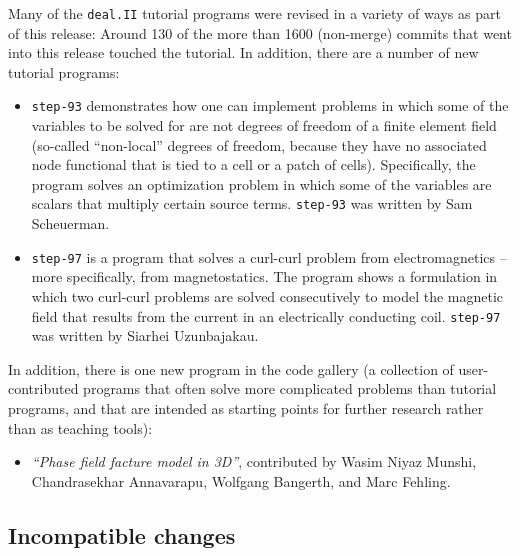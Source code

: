 \documentclass{ansarticle-preprint}
\newcommand{\specialword}[1]{\texttt{#1}}
\newcommand{\dealii}{{\specialword{deal.II}}\xspace}
\newcommand{\step}[1]{{\specialword{step-#1}}\xspace}
\begin{document}
Many of the \dealii tutorial programs were revised in a variety of ways
as part of this release: Around 130 of the more than 1600 (non-merge)
commits that went into this release touched the tutorial.
In addition, there are a number of new tutorial
programs:
\begin{itemize}
  \item
    \step{93}
    demonstrates how one can implement problems in which some of the
    variables to be solved for are not degrees of freedom of a finite
    element field (so-called ``non-local'' degrees of freedom, because
    they have no associated node functional that is tied to a cell or
    a patch of cells). Specifically, the program solves an
    optimization problem in which some of the variables are scalars
    that multiply certain source terms.
    \step{93} was written by Sam Scheuerman.
  \item
    \step{97}
    is a program that solves a curl-curl problem from electromagnetics
    -- more specifically, from magnetostatics. The program shows a
    formulation in which two curl-curl problems are solved
    consecutively to model the magnetic field that results from the
    current in an electrically conducting coil.
    \step{97} was written by Siarhei Uzunbajakau.
\end{itemize}

In addition, there is one new program in the code gallery (a collection of
user-contributed programs that often solve more complicated problems
than tutorial programs, and that are intended as starting points for further
research rather than as teaching tools):
\begin{itemize}
  \item \emph{``Phase field facture model in 3D''},
    contributed by Wasim Niyaz Munshi,
    Chandrasekhar Annavarapu,
    Wolfgang Bangerth, and
    Marc Fehling.
\end{itemize}



\subsection{Incompatible changes}\label{subsec:deprecated}
\end{document}
